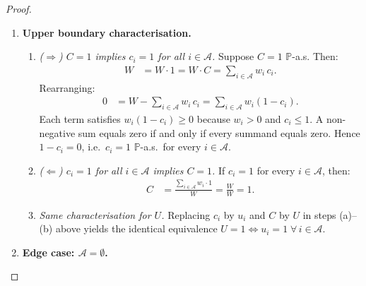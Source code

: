 \documentclass[12pt,openany]{book}
\newcommand{\Prob}{\mathbb{P}}
\numberwithin{equation}{chapter}
\theoremstyle{plain}
\theoremstyle{definition}
\theoremstyle{remark}
\numberwithin{equation}{chapter}
\theoremstyle{plain}
\begin{document}
\begin{proof}
\begin{enumerate}
\begin{enumerate}
    \item \emph{Same characterisation for $U$.}
      Replacing $c_i$ by $u_i$ and $C$ by $U$ in
      steps (a)--(b) above yields the identical equivalence
      $U = 0 \Leftrightarrow u_i = 0\;\forall\, i \in
      \mathcal{A}$.
  \end{enumerate}

  \item \textbf{Upper boundary characterisation.}

  \begin{enumerate}
    \item \emph{($\Rightarrow$) $C = 1$ implies $c_i = 1$
      for all $i \in \mathcal{A}$.}
      Suppose $C = 1$ $\Prob$-a.s.  Then:
      \begin{align}
        W
          &= W \cdot 1
           = W \cdot C
           = \sum_{i \in \mathcal{A}} w_i\, c_i.
      \end{align}
      Rearranging:
      \begin{align}
        0
          &= W - \sum_{i \in \mathcal{A}} w_i\, c_i
           = \sum_{i \in \mathcal{A}} w_i (1 - c_i).
      \end{align}
      Each term satisfies $w_i(1 - c_i) \geq 0$ because
      $w_i > 0$ and $c_i \leq 1$.  A non-negative sum
      equals zero if and only if every summand equals zero.
      Hence $1 - c_i = 0$, i.e.\ $c_i = 1$ $\Prob$-a.s.\
      for every $i \in \mathcal{A}$.

    \item \emph{($\Leftarrow$) $c_i = 1$ for all
      $i \in \mathcal{A}$ implies $C = 1$.}
      If $c_i = 1$ for every $i \in \mathcal{A}$, then:
      \begin{align}
        C
          &= \frac{\sum_{i \in \mathcal{A}} w_i \cdot 1}{W}
           = \frac{W}{W}
           = 1.
      \end{align}

    \item \emph{Same characterisation for $U$.}
      Replacing $c_i$ by $u_i$ and $C$ by $U$ in
      steps (a)--(b) above yields the identical equivalence
      $U = 1 \Leftrightarrow u_i = 1\;\forall\, i \in
      \mathcal{A}$.
  \end{enumerate}

  \item \textbf{Edge case: $\mathcal{A} = \emptyset$.}


\end{enumerate}
\end{proof}
\end{document}
